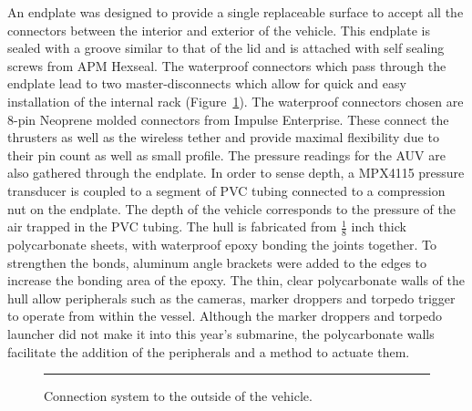 An endplate was designed to provide a single replaceable surface to accept all the connectors between the interior and exterior of the vehicle.  This endplate is sealed with a groove similar to that of the lid and is attached with self sealing screws from APM Hexseal.  The waterproof connectors which pass through the endplate lead to two master-disconnects which allow for quick and easy installation of the internal rack (Figure~\ref{endplate}).
The waterproof connectors chosen are 8-pin Neoprene molded connectors
from Impulse Enterprise.  These connect the thrusters as well as the
wireless tether and provide maximal flexibility due to their pin count
as well as small profile.  
The pressure readings for the AUV are also gathered  through the
endplate. In order to sense depth, a MPX4115 pressure transducer is
coupled to a segment of PVC tubing connected to a compression nut on
the endplate.  The depth of the vehicle corresponds to the pressure of
the air trapped in the PVC tubing.
  The hull is fabricated from
$\frac{1}{8}$ inch thick polycarbonate sheets, with waterproof epoxy bonding
the joints together.  To strengthen the bonds, aluminum angle brackets
were added to the edges to increase the bonding area of the epoxy. The thin, clear polycarbonate walls of the hull allow peripherals such as the cameras, marker droppers and torpedo trigger to operate from within the vessel.
Although the marker droppers and torpedo launcher did not make it into this
year's submarine, the polycarbonate walls facilitate the addition of the
peripherals and a method to actuate them.

\begin{figure}
\begin{center}
\vspace{.05in}
\hrule
\caption{Connection system to the outside of the vehicle.}\label{endplate}
\end{center}
\end{figure}

